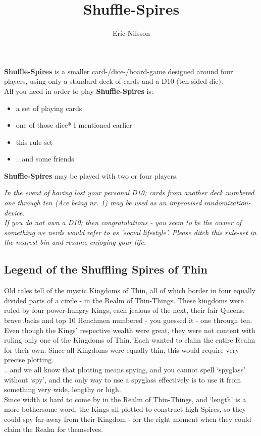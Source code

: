 \documentclass[11pt,twocolumn]{article}
\title{Shuffle-Spires}
\author{Eric Nilsson}
\date{}
\begin{document}
\maketitle

\noindent
\textbf{Shuffle-Spires} is a smaller card-/dice-/board-game designed around four players, using only a standard deck of cards and a D10 (ten sided die). \\
All you need in order to play \textbf{Shuffle-Spires} is:
\begin{itemize}
\renewcommand{\labelitemi}{$\bullet$}
\item a set of playing cards
\item one of those dice* I mentioned earlier
\item this rule-set
\item ...and some friends
\end{itemize}
\textbf{Shuffle-Spires} may be played with two or four players.

\noindent
{\it*In the event of having lost your personal D10; cards from another deck numbered one through ten (Ace being nr. 1) may be used as an improvised randomization-device.} \\
{\it*If you do not own a D10; then congratulations - you seem to be the owner of something we nerds would refer to as ‘social lifestyle’. Please ditch this rule-set in the nearest bin and resume enjoying your life.}

\subsection{Legend of the Shuffling Spires of Thin}
Old tales tell of the mystic Kingdoms of Thin, all of which border in four equally divided parts of a circle - in the Realm of Thin-Things.
These kingdoms were ruled by four power-hungry Kings, each jealous of the next, their fair Queens, brave Jacks and top 10 Henchmen numbered - you guessed it - one through ten. \\
Even though the Kings’ respective wealth were great, they were not content with ruling only one of the Kingdoms of Thin. Each wanted to claim the entire Realm for their own. Since all Kingdoms were equally thin, this would require very precise plotting. \\
...and we all know that plotting means spying, and you cannot spell ‘spyglass’ without ‘spy’, and the only way to use a spyglass effectively is to use it from something very wide, lengthy or high. \\ 
\noindent
Since width is hard to come by in the Realm of Thin-Things, and ‘length’ is a more bothersome word, the Kings all plotted to construct high Spires, so they could spy far-away from their Kingdom - for the right moment when they could claim the Realm for themselves.
\end{document}
